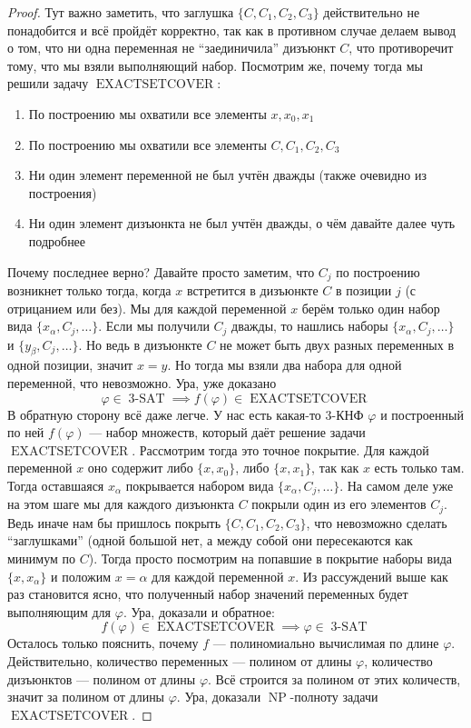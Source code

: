 \documentclass[11pt]{article}
\DeclareMathOperator{\tSAT}{3-SAT}
\DeclareMathOperator{\NP}{NP}
\DeclareMathOperator{\EXACTSETC}{EXACTSETCOVER}
\begin{document}
\begin{proof}
  Тут важно заметить, что заглушка $\{C, C_1, C_2, C_3\}$ действительно не понадобится и всё пройдёт корректно, так как в противном случае делаем вывод о том, 
  что ни одна переменная не ``заединичила'' дизъюнкт $C$, что противоречит тому, что мы взяли выполняющий набор.
  Посмотрим же, почему тогда мы решили задачу $\EXACTSETC$:
  \begin{enumerate}
    \item По построению мы охватили все элементы $x, x_0, x_1$
    \item По построению мы охватили все элементы $C, C_1, C_2, C_3$
    \item Ни один элемент переменной не был учтён дважды (также очевидно из построения)
    \item Ни один элемент дизъюнкта не был учтён дважды, о чём давайте далее чуть подробнее
  \end{enumerate}
  Почему последнее верно? Давайте просто заметим, что $C_j$ по построению возникнет только тогда, когда $x$ встретится в дизъюнкте $C$ в позиции $j$ (с отрицанием или без). 
  Мы для каждой переменной $x$ берём только один набор вида $\{x_\alpha, C_j, \ldots\}$. Если мы получили $C_j$ дважды, то нашлись наборы $\{x_\alpha, C_j, \ldots\}$ и $\{y_\beta, C_j, \ldots\}$.
  Но ведь в дизъюнкте $C$ не может быть двух разных переменных в одной позиции, значит $x = y$. Но тогда мы взяли два набора для одной переменной, что невозможно.
  Ура, уже доказано
  \[\varphi \in \tSAT \implies f(\varphi) \in \EXACTSETC\]
  В обратную сторону всё даже легче. У нас есть какая-то 3-КНФ $\varphi$ и построенный по ней $f(\varphi)$ --- набор множеств, который даёт решение задачи $\EXACTSETC$.
  Рассмотрим тогда это точное покрытие. Для каждой переменной $x$ оно содержит либо $\{x, x_0\}$, либо $\{x, x_1\}$, так как $x$ есть только там. Тогда оставшаяся $x_\alpha$ покрывается набором 
  вида $\{x_\alpha, C_j, \ldots\}$. На самом деле уже на этом шаге мы для каждого дизъюнкта $C$ покрыли один из его элементов $C_j$. Ведь иначе нам бы пришлось покрыть $\{C, C_1, C_2, C_3\}$, 
  что невозможно сделать ``заглушками'' (одной большой нет, а между собой они пересекаются как минимум по $C$). Тогда просто посмотрим на попавшие в покрытие наборы вида $\{x, x_\alpha\}$ и 
  положим $x = \alpha$ для каждой переменной $x$. Из рассуждений выше как раз становится ясно, что полученный набор значений переменных будет выполняющим для $\varphi$. Ура, доказали и обратное:
  \[f(\varphi) \in \EXACTSETC \implies \varphi \in \tSAT\]
  Осталось только пояснить, почему $f$ --- полиномиально вычислимая по длине $\varphi$. Действительно, количество переменных --- полином от длины $\varphi$, количество дизъюнктов --- полином от длины $\varphi$. 
  Всё строится за полином от этих количеств, значит за полином от длины $\varphi$. Ура, доказали $\NP$-полноту задачи $\EXACTSETC$.
\end{proof}
\end{document}
